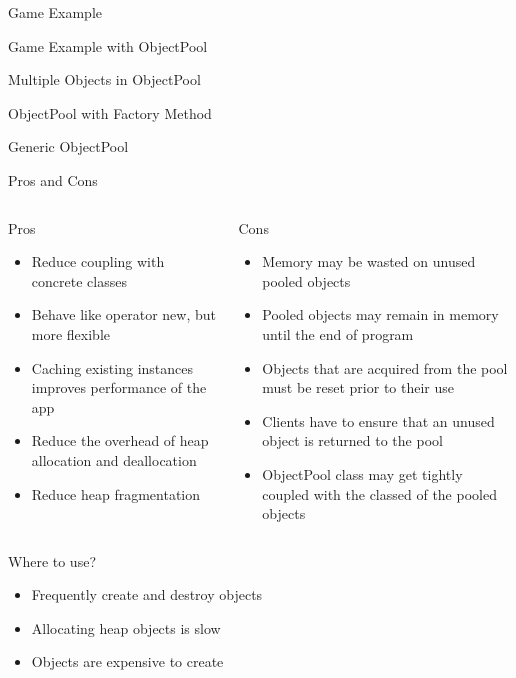 \documentclass[13pt]{beamer}
\begin{document}
\begin{frame}{Game Example}

\end{frame}

\begin{frame}{Game Example with ObjectPool}

\end{frame}

\begin{frame}{Multiple Objects in ObjectPool}

\end{frame}

\begin{frame}{ObjectPool with Factory Method}

\end{frame}

\begin{frame}{Generic ObjectPool}

\end{frame}

\begin{frame}{Pros and Cons}	
\begin{columns}[T]
\begin{column}{.45\textwidth}
	Pros
	\begin{itemize}
		\setlength\itemsep{1em}
		\item Reduce coupling with concrete classes
		\item Behave like operator new, but more flexible
		\item Caching existing instances improves performance of the app
		\item Reduce the overhead of heap allocation and deallocation
		\item Reduce heap fragmentation
	\end{itemize}
\end{column}
\begin{column}{.45\textwidth}
	Cons	
	\begin{itemize}
		\setlength\itemsep{1em}
		\item Memory may be wasted on unused pooled objects
		\item Pooled objects may remain in memory until the end of program
		\item Objects that are acquired from the pool must be reset prior to their use
		\item Clients have to ensure that an unused object is returned to the pool
		\item ObjectPool class may get tightly coupled with the classed of the pooled objects
	\end{itemize}
\end{column}
\end{columns}
\end{frame}

\begin{frame}{Where to use?}	
	\begin{itemize}
		\setlength\itemsep{1em}
		\item Frequently create and destroy objects
		\item Allocating heap objects is slow
		\item Objects are expensive to create
	\end{itemize}
\end{frame}
\end{document}

